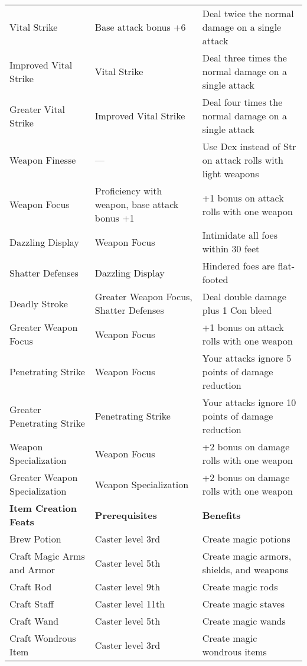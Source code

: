 \begin{table*}
  \sffamily
  \setlength{\tabcolsep}{1pt}
\begin{tabularx}{\linewidth}{lXl}
Vital Strike & Base attack bonus +6 & Deal twice the normal damage on a single attack\\
\quad Improved Vital Strike & Vital Strike & Deal three times the normal damage on a single attack\\
\quad \quad Greater Vital Strike & Improved Vital Strike & Deal four times the normal damage on a single attack\\
Weapon Finesse & --- & Use Dex instead of Str on attack rolls with light weapons\\
Weapon Focus & Proficiency with weapon, base attack bonus +1 & +1 bonus on attack rolls with one weapon\\
\quad Dazzling Display & Weapon Focus & Intimidate all foes within 30 feet\\
\quad \quad Shatter Defenses & Dazzling Display & Hindered foes are flat-footed \\
\quad \quad \quad Deadly Stroke & Greater Weapon Focus, Shatter Defenses & Deal double damage plus 1 Con bleed \\
\quad Greater Weapon Focus & Weapon Focus & +1 bonus on attack rolls with one weapon\\
\quad Penetrating Strike & Weapon Focus & Your attacks ignore 5 points of damage reduction\\
\quad \quad Greater Penetrating Strike & Penetrating Strike & Your attacks ignore 10 points of damage reduction\\
\quad Weapon Specialization & Weapon Focus & +2 bonus on damage rolls with one weapon\\
\quad \quad Greater Weapon Specialization & Weapon Specialization & +2 bonus on damage rolls with one weapon\\
\textbf{Item Creation Feats} & \textbf{Prerequisites} & \textbf{Benefits}\\
Brew Potion & Caster level 3rd & Create magic potions\\
Craft Magic Arms and Armor & Caster level 5th & Create magic armors, shields, and weapons\\
Craft Rod & Caster level 9th & Create magic rods\\
Craft Staff & Caster level 11th & Create magic staves\\
Craft Wand & Caster level 5th & Create magic wands\\
Craft Wondrous Item & Caster level 3rd & Create magic wondrous items\\

\end{tabularx}
\end{table*}
